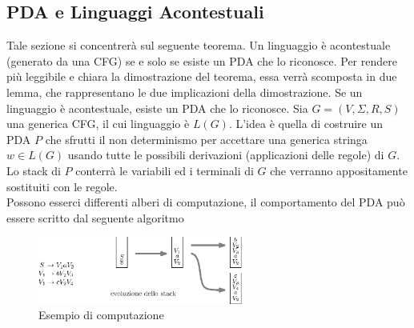 \documentclass[10pt, letterpaper]{report}
\begin{document}
\subsection{PDA e Linguaggi Acontestuali}
Tale sezione si concentrerà sul seguente teorema.\acc 
\teo{} Un linguaggio è acontestuale (generato da una CFG) se e solo se esiste un PDA che lo riconosce.
Per rendere più leggibile e chiara la dimostrazione del teorema, essa verrà scomposta in due lemma, che rappresentano le due implicazioni della 
dimostrazione. \acc 
\lemma{[$\implies$]}  Se un linguaggio è acontestuale, esiste un PDA che lo riconosce. \acc 
\dimo{[$\implies$]} Sia $G=(V,\Sigma, R, S)$ una generica CFG, il cui linguaggio è $L(G)$. L'idea è quella di costruire un PDA  $P$
che sfrutti il non determinismo per accettare una generica stringa $w\in L(G)$ usando tutte le possibili 
derivazioni (applicazioni delle regole) di $G$.\acc 
Lo stack di $P$ conterrà le variabili ed i terminali di $G$ che verranno appositamente sostituiti con le regole.\\ 
Possono esserci differenti alberi di computazione, il comportamento del PDA può essere scritto dal seguente 
algoritmo 
\begin{figure}[h!]
    \centering 
    \includegraphics[width=0.6\textwidth ]{images/esempioCFGPDA.eps}
    \caption{Esempio di computazione}
    \label{fig:esePDACGF}
\end{figure}
\end{document}
